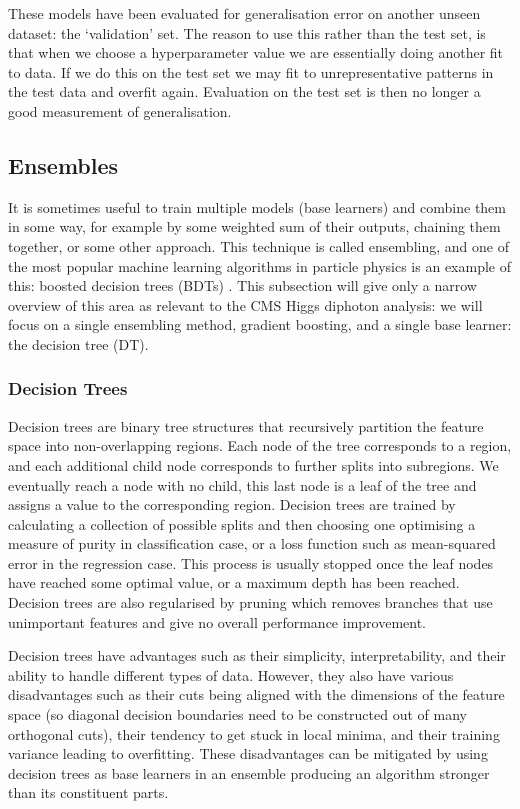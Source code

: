 These models have been evaluated for generalisation error on another unseen dataset: the `validation' set. The reason to use this rather than the test set, is that when we choose a hyperparameter value we are essentially doing another fit to data. If we do this on the test set we may fit to unrepresentative patterns in the test data and overfit again. Evaluation on the test set is then no longer a good measurement of generalisation. 








\subsection{Ensembles}
It is sometimes useful to train multiple models (base learners) and combine them in some way, for example by some weighted sum of their outputs, chaining them together, or some other approach. This technique is called ensembling, and one of the most popular machine learning algorithms in particle physics is an example of this: boosted decision trees (BDTs) \cite{MiniBooneBDT}. This subsection will give only a narrow overview of this area as relevant to the CMS Higgs diphoton analysis: we will focus on a single ensembling method, gradient boosting, and a single base learner: the decision tree (DT).


\subsubsection{Decision Trees}
Decision trees \cite{DecisionTrees} are binary tree structures that recursively partition the feature space into non-overlapping regions. Each node of the tree corresponds to a region, and each additional child node corresponds to further splits into subregions. We eventually reach a node with no child, this last node is a leaf of the tree and assigns a value to the corresponding region.  
Decision trees are trained by calculating a collection of possible splits and then choosing one optimising a measure of purity in classification case, or a loss function such as mean-squared error in the regression case. This process is usually stopped once the leaf nodes have reached some optimal value, or a maximum depth has been reached. 
Decision trees are also regularised by pruning which removes branches that use unimportant features and give no overall performance improvement. 

Decision trees have advantages such as their simplicity, interpretability, and their ability to handle different types of data. However, they also have various disadvantages such as their cuts being aligned with the dimensions of the feature space (so diagonal decision boundaries need to be constructed out of many orthogonal cuts), their tendency to get stuck in local minima, and their training variance leading to overfitting. These disadvantages can be mitigated by using decision trees as base learners in an ensemble producing an algorithm stronger than its constituent parts. 

